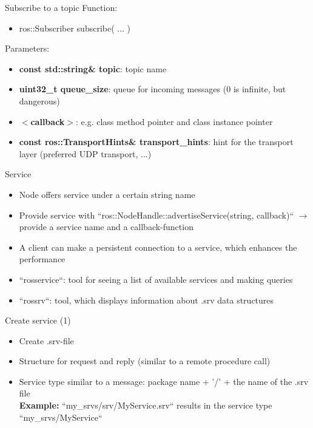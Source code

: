 \documentclass{beamer}
\begin{document}
\begin{frame}{Subscribe to a topic}
	Function:
	\begin{itemize}
		\item ros::Subscriber subscribe( ... )
	\end{itemize}
	Parameters:
	\begin{itemize}
		\item \textbf{const std::string\& topic}: topic name
		\item \textbf{uint32\_t queue\_size}: queue for incoming messages (0 is infinite, but dangerous)
		\item \textbf{$<$callback$>$}: e.g. class method pointer and class instance pointer
		\item \textbf{const ros::TransportHints\& transport\_hints}: hint for the transport layer (preferred UDP transport, ...)
	\end{itemize}
\end{frame}

\begin{frame}{Service}
	\begin{itemize}
		\item Node offers service under a certain string name
		\item Provide service with ``ros::NodeHandle::advertiseService(string, callback)`` $\rightarrow$ provide a service name and a callback-function
		\item A client can make a persistent connection to a service, which enhances the performance
		\item ``rosservice``: tool for seeing a list of available services and making queries
		\item ``rossrv``: tool, which displays information about .srv data structures
	\end{itemize}
\end{frame}	

\begin{frame}{Create service (1)}
	\begin{itemize}
		\item Create .srv-file
		\item Structure for request and reply (similar to a remote procedure call)
		
		\item Service type similar to a message: package name + '/' + the name of the .srv file\\
		\textbf{Example:} ``my\_srvs/srv/MyService.srv`` results in the service type ``my\_srvs/MyService``
	\end{itemize}
\end{frame}
\end{document}
